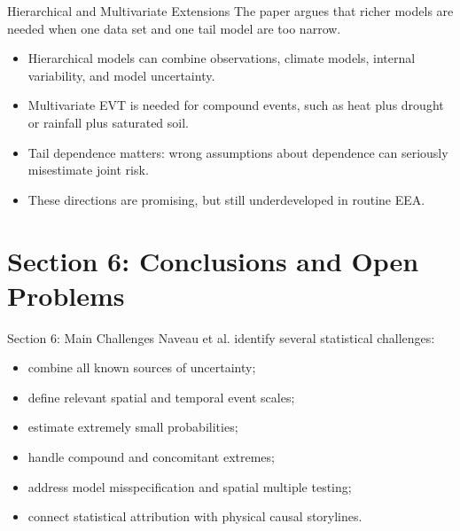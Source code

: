 \documentclass[aspectratio=169]{beamer}
\begin{document}
\begin{frame}{Hierarchical and Multivariate Extensions}
  The paper argues that richer models are needed when one data set and one tail model are too narrow.

  \begin{itemize}
    \item Hierarchical models can combine observations, climate models, internal variability, and model uncertainty.
    \item Multivariate EVT is needed for compound events, such as heat plus drought or rainfall plus saturated soil.
    \item Tail dependence matters: wrong assumptions about dependence can seriously misestimate joint risk.
    \item These directions are promising, but still underdeveloped in routine EEA.
  \end{itemize}
\end{frame}

\section{Section 6: Conclusions and Open Problems}

\begin{frame}{Section 6: Main Challenges}
  Naveau et al. identify several statistical challenges:

  \begin{itemize}
    \item combine all known sources of uncertainty;
    \item define relevant spatial and temporal event scales;
    \item estimate extremely small probabilities;
    \item handle compound and concomitant extremes;
    \item address model misspecification and spatial multiple testing;
    \item connect statistical attribution with physical causal storylines.
  \end{itemize}
\end{frame}
\end{document}
